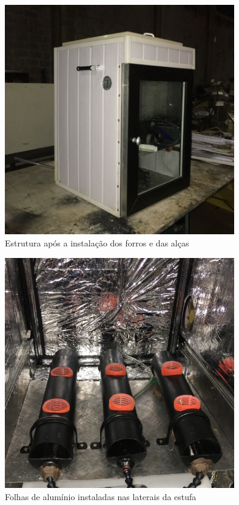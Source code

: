 \begin{figure}[H]
	\centering
	\includegraphics[width=10cm]{figuras/isolamento3.png}
	\caption{Estrutura após a instalação dos forros e das alças}
	\label{fig:isolamento3}
\end{figure}
\begin{figure}[H]
	\centering
	\includegraphics[width=10cm]{figuras/folha_aluminio.jpg}
	\caption{Folhas de alumínio instaladas nas laterais da estufa}
	\label{fig:folha_aluminio}
\end{figure}
